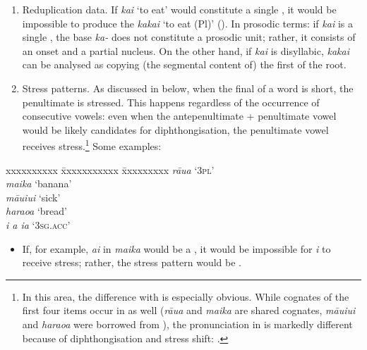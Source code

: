 \begin{enumerate}
\item 
Reduplication data. If \textit{kai} ‘to eat’ would constitute a single , it would be impossible to produce the  \textit{kakai} ‘to eat (Pl)’ (). In prosodic terms: if \textit{kai} is a single , the  base \textit{ka-} does not constitute a prosodic unit; rather, it consists of an onset and a partial nucleus. On the other hand, if \textit{kai} is disyllabic, \textit{kakai} can be analysed as copying (the segmental content of) the first  of the root.

\item 
Stress patterns. As discussed in  below, when the final  of a word is short, the penultimate  is stressed. This happens regardless of the occurrence of consecutive vowels: even when the antepenultimate + penultimate vowel would be likely candidates for diphthongisation, the penultimate vowel receives stress.\footnote{\label{fn:40}In this area, the difference with  is especially obvious. While cognates of the first four items occur in  as well (\textit{r}\textit{āua} and \textit{maika} are shared cognates, \textit{māuiui} and \textit{haraoa} were borrowed from ), the pronunciation in  is markedly different because of diphthongisation and stress shift: .} Some examples:
\end{enumerate}
\ea
\begin{tabbing}
 xxxxxxxxxx \= xxxxxxxxxxx \= xxxxxxxxx \kill
 \textit{rāua} \>   \>  ‘\textsc{3pl}’\\
 \textit{maika} \>   \>  ‘banana’\\
 \textit{māuiui} \>   \>  ‘sick’\\
 \textit{haraoa} \>   \>  ‘bread’\\
 \textit{i a ia} \>   \>  ‘3\textsc{sg}.\textsc{acc}’
\end{tabbing}
\z
\begin{itemize} 
\item[]
If, for example, \textit{ai} in \textit{maika} would be a , it would be impossible for \textit{i} to receive stress; rather, the stress pattern would be \textstyleIPA{[ˈmaika]}.
\end{itemize} 

